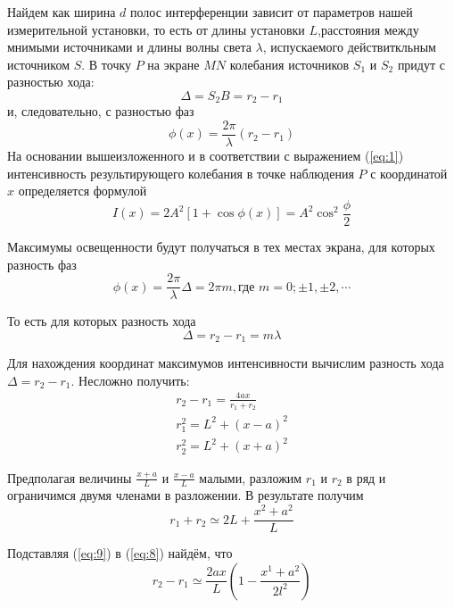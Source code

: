 Найдем как ширина $d$ полос интерференции зависит от параметров нашей измерительной установки, то есть от длины установки $L$,расстояния между мнимыми источниками и длины волны света  
$\lambda$, испускаемого действиткльным источником $S$. В точку $P$ на экране $MN$ колебания источников $S_1$ и $S_2$ придут с разностью хода:
\begin{equation}
	\Delta=S_2B=r_2-r_1
\end{equation}
и, следовательно, с разностью фаз
\begin{equation}
	\phi(x)=\frac{2\pi}{\lambda}(r_2-r_1)
\end{equation}
На основании вышеизложенного и в соответствии с выражением (\ref{eq:1}) интенсивность результирующего колебания в точке наблюдения $P$ с координатой $x$ определяется формулой
\begin{equation}
	I(x)=2A^2[1+\cos{\phi(x)}]=A^2\cos^2{\frac{\phi}{2}}
\end{equation}

Максимумы освещенности будут получаться в тех местах экрана, для которых разность фаз
\begin{equation}
	\phi(x)=\frac{2\pi}{\lambda}\Delta=2\pi m, \text{где } m=0;\pm 1,\pm 2,\cdots
\end{equation}

То есть для которых разность хода
\begin{equation}
	\Delta=r_2-r_1=m\lambda
\end{equation}

Для нахождения координат максимумов интенсивности вычислим разность хода $\Delta=r_2-r_1$. Несложно получить: 
\begin{gather}
	\label{eq:8}
	r_2-r_1=\frac{4ax}{r_1+r_2} \\ \nonumber
	r_1^2=L^2+(x-a)^2 \\ \nonumber
	r_2^2=L^2+(x+a)^2 \nonumber
\end{gather}


Предполагая величины $\frac{x+a}{L}$ и $\frac{x-a}{L}$ малыми, разложим $r_1$ и $r_2$ в ряд и ограничимся двумя членами в разложении. В результате получим
\begin{equation}
	\label{eq:9}
	r_1+r_2\simeq 2L +\frac{x^2+a^2}{L} 
\end{equation}

Подставляя (\ref{eq:9}) в (\ref{eq:8}) найдём, что 
\begin{equation}
	r_2-r_1\simeq \frac{2ax}{L}\left(1-\frac{x^1+a^2}{2l^2} \right) \label{eq:10}
\end{equation}


